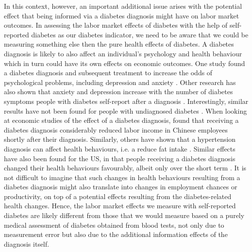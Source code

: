\documentclass[12pt,english,british]{article}
\begin{document}
In this context, however, an important additional issue arises with the potential effect that being informed via a diabetes diagnosis
might have on labor market outcomes. In assessing the labor market
effects of diabetes with the help of self-reported diabetes as our
diabetes indicator, we need to be aware that we could be measuring
something else then the pure health effects of diabetes. A diabetes
diagnosis is likely to also affect an individual's psychology and
health behaviour which in turn could have its own effects on economic
outcomes. One study found a diabetes diagnosis and subsequent treatment
to increase the odds of psychological problems, including depression
and anxiety \citep{Thoolen2006a}. Other research has also shown that
anxiety and depression increase with the number of diabetes symptoms
people with diabetes self-report after a diagnosis \cite{Paddison_2011}.
Interestingly, similar results have not been found for people with
undiagnosed diabetes \citep{Nouwen2011}. When looking at economic
studies of the effect of a diabetes diagnosis, \citet{Liu2014} found
that receiving a diabetes diagnosis considerably reduced labor income
in Chinese employees shortly after their diagnosis. Similarly, others
have shown that a hypertension diagnosis can affect health
behaviours, i.e. a reduce fat intake \citep{Zhao2013a}. Similar effects have also been found
for the US, in that people receiving a diabetes diagnosis changed
their health behaviours favourably, albeit only over the short term
\citep{Slade2012}. It is not difficult to imagine that such changes in
health behaviours resulting from a diabetes diagnosis might also translate
into changes in employment chances or productivity, on top of a potential
effects resulting from the diabetes-related health changes. Hence, the labor market effects we measure with self-reported diabetes are likely different from those
that we would measure based on a purely medical assessment of diabetes
obtained from blood tests, not only due to measurement error but also
due to the additional information effects of the diagnosis itself.
\end{document}
